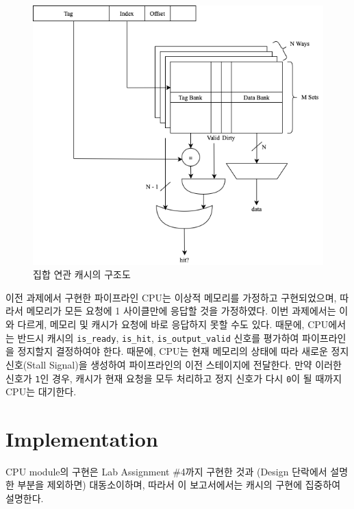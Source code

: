 \documentclass[openright, a4paper]{article}
\newcommand{\code}[1]{\texttt{#1}}
\begin{document}
{
    \begin{figure}[!h]
        \centering
        \includegraphics[width=\textwidth]{img/schematic.png}
        \caption{집합 연관 캐시의 구조도}
    \end{figure}
}

\hfill

이전 과제에서 구현한 파이프라인 CPU는 이상적 메모리를 가정하고 구현되었으며,
따라서 메모리가 모든 요청에 1 사이클만에 응답할 것을 가정하였다. 이번 과제에서는
이와 다르게, 메모리 및 캐시가 요청에 바로 응답하지 못할 수도 있다. 때문에, 
CPU에서는 반드시 캐시의 \code{is_ready}, \code{is_hit}, \code{is_output_valid}
신호를 평가하여 파이프라인을 정지할지 결정하여야 한다. 때문에, CPU는 현재
메모리의 상태에 따라 새로운 정지 신호(Stall Signal)을 생성하여 파이프라인의 이전
스테이지에 전달한다. 만약 이러한 신호가 \code{1}인 경우, 캐시가 현재 요청을 모두
처리하고 정지 신호가 다시 \code{0}이 될 때까지 CPU는 대기한다.

\hfill


\section{Implementation}

CPU module의 구현은 Lab Assignment \#4까지 구현한 것과 (Design 단락에서 설명한 
부분을 제외하면) 대동소이하며, 따라서 이 보고서에서는 캐시의 구현에 집중하여
설명한다.
\end{document}
